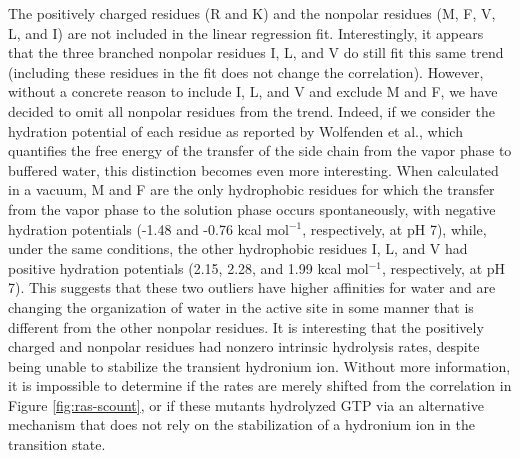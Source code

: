 The positively charged residues (R and K) and the nonpolar residues (M, F, V, L, and I) are not included in the linear regression fit. 
Interestingly, it appears that the three branched nonpolar residues I, L, and V do still fit this same trend (including these residues in the fit does not change the correlation). 
However, without a concrete reason to include I, L, and V and exclude M and F, we have decided to omit all nonpolar residues from the trend. 
Indeed, if we consider the hydration potential of each residue as reported by Wolfenden et al.\cite{Wolfenden1981}, which quantifies the free energy of the transfer of the side chain from the vapor phase to buffered water, this distinction becomes even more interesting. 
When calculated in a vacuum, M and F are the only hydrophobic residues for which the transfer from the vapor phase to the solution phase occurs spontaneously, with negative hydration potentials (-1.48 and -0.76 kcal mol$^{-1}$, respectively, at pH 7), while, under the same conditions, the other hydrophobic residues I, L, and V had positive hydration potentials (2.15, 2.28, and 1.99 kcal mol$^{-1}$, respectively, at pH 7). 
This suggests that these two outliers have higher affinities for water and are changing the organization of water in the active site in some manner that is different from the other nonpolar residues. 
It is interesting that the positively charged and nonpolar residues had nonzero intrinsic hydrolysis rates, despite being unable to stabilize the transient hydronium ion. 
Without more information, it is impossible to determine if the rates are merely shifted from the correlation in Figure \ref{fig:ras-scount}, or if these mutants hydrolyzed GTP via an alternative mechanism that does not rely on the stabilization of a hydronium ion in the transition state.

